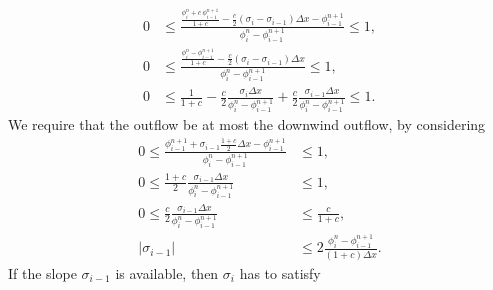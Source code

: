 \documentclass[../thesis.tex]{subfiles}
\begin{document}
\begin{equation}
    \begin{split}\label{eqn: urc-all c-necessary}
        0
        &\leq
        \frac{
        \frac{\phi_{i}^{n} +
        c~\phi_{i-1}^{n+1}}{1+c}
        -\frac{c}{2}\left(
            \sigma_{i} - \sigma_{i-1}
            \right)\Delta x - \phi_{i-1}^{n+1}}{\phi_{i}^{n} - \phi_{i-1}^{n+1}}
        \leq
        1,
        \\
        0
        &\leq
        \frac{
        \frac{\phi_{i}^{n} - \phi_{i-1}^{n+1}}{1+c}
        -\frac{c}{2}\left(
            \sigma_{i} - \sigma_{i-1}
            \right)\Delta x}{\phi_{i}^{n} - \phi_{i-1}^{n+1}}
        \leq
        1,
        \\
        0
        &\leq
        \frac{1}{1+c}
        -\frac{c}{2}
        \frac{\sigma_{i}\Delta x}
        {\phi_{i}^{n} - \phi_{i-1}^{n+1}}
        +\frac{c}{2}
        \frac{\sigma_{i-1}\Delta x}
        {\phi_{i}^{n} - \phi_{i-1}^{n+1}}
        \leq
        1.
    \end{split}
\end{equation}
We require that the outflow be at most the downwind outflow, by considering
\begin{equation}\label{eqn: urc-all c-bounded slope}
    \begin{split}
        0
        \leq
        \frac{\phi_{i-1}^{n+1}
        +\sigma_{i-1}\frac{1+c}{2}\Delta x
        - \phi_{i-1}^{n+1}}{\phi_{i}^{n} - \phi_{i-1}^{n+1}}
        &\leq
        1,
        \\
        0
        \leq
        \frac{1+c}{2}
        \frac{\sigma_{i-1}\Delta x}
        {\phi_{i}^{n} - \phi_{i-1}^{n+1}}
        &\leq
        1,
        \\
        0
        \leq
        \frac{c}{2}
        \frac{\sigma_{i-1}\Delta x}
        {\phi_{i}^{n} - \phi_{i-1}^{n+1}}
        &\leq
        \frac{c}{1+c},
        \\
        |\sigma_{i-1}|
        &\leq
        2\frac{\phi_{i}^{n} - \phi_{i-1}^{n+1}}
        {(1+c)\Delta x}.
    \end{split}
\end{equation}
If the slope \(\sigma_{i-1}\) is available, then
\(\sigma_{i}\) has to satisfy
\end{document}
